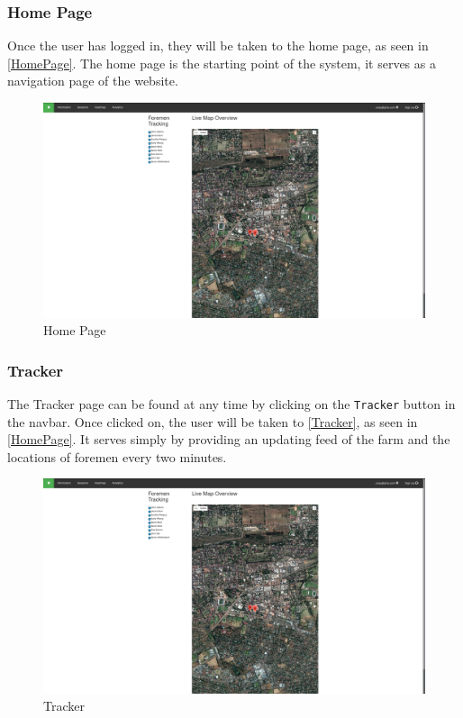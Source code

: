 \documentclass[11pt]{article}
\begin{document}
\subsubsection{Home Page}
\label{webHome}
Once the user has logged in, they will be taken to the home page, as seen in \ref{HomePage}. The home page is the starting point of the system, it serves as a navigation page of the website.

\begin{figure}
 \centering
 \includegraphics[width=12cm, keepaspectratio]{Images/webHome-Page.png}
 \caption{Home Page}
 \label{webHome}
\end{figure}

\subsubsection{Tracker}
\label{webTracker}
The Tracker page can be found at any time by clicking on the \texttt{Tracker} button in the navbar. Once clicked on, the user will be taken to \ref{Tracker}, as seen in \ref{HomePage}. It serves simply by providing an updating feed of the farm and the locations of foremen every two minutes.

\begin{figure}
 \centering
 \includegraphics[width=12cm, keepaspectratio]{Images/webHome-Page.png}
 \caption{Tracker}
 \label{webTracker}
\end{figure}
\end{document}
